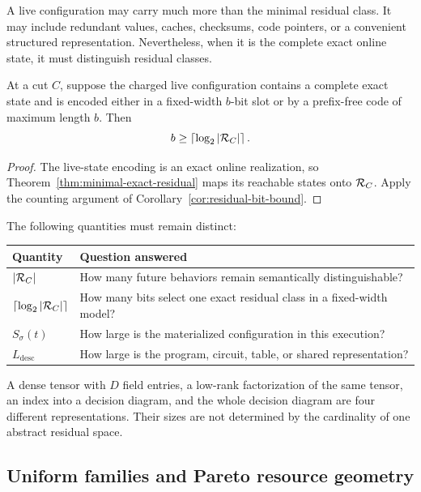 A live configuration may carry much more than the minimal residual class.  It
may include redundant values, caches, checksums, code pointers, or a convenient
structured representation.  Nevertheless, when it is the complete exact online
state, it must distinguish residual classes.

\begin{proposition}
\label{prop:live-residual-bound}
At a cut $C$, suppose the charged live configuration contains a complete exact
state and is encoded either in a fixed-width $b$-bit slot or by a prefix-free
code of maximum length $b$.  Then
\[
  b\ge\left\lceil\log_2|\mathcal R_C|\right\rceil.
\]
\end{proposition}

\begin{proof}
The live-state encoding is an exact online realization, so
Theorem~\ref{thm:minimal-exact-residual} maps its reachable states onto
$\mathcal R_C$.  Apply the counting argument of
Corollary~\ref{cor:residual-bit-bound}.
\end{proof}

The following quantities must remain distinct:

\begin{center}
\begin{tabular}{L{0.25\textwidth}L{0.65\textwidth}}
\toprule
Quantity & Question answered\\
\midrule
$|\mathcal R_C|$ & How many future behaviors remain semantically distinguishable?\\
$\lceil\log_2|\mathcal R_C|\rceil$ & How many bits select one exact residual class in a fixed-width model?\\
$S_\sigma(t)$ & How large is the materialized configuration in this execution?\\
$L_{\mathrm{desc}}$ & How large is the program, circuit, table, or shared representation?\\
\bottomrule
\end{tabular}
\end{center}

A dense tensor with $D$ field entries, a low-rank factorization of the same
tensor, an index into a decision diagram, and the whole decision diagram are
four different representations.  Their sizes are not determined by the
cardinality of one abstract residual space.

\subsection{Uniform families and Pareto resource geometry}

